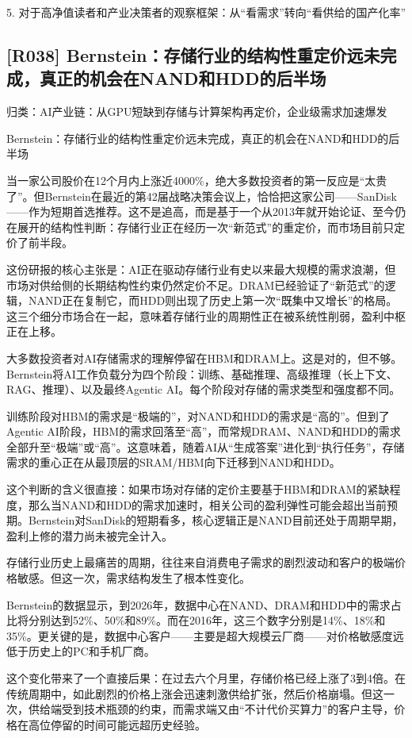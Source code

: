 \documentclass[11pt]{ctexart}
\begin{document}
5. 对于高净值读者和产业决策者的观察框架：从“看需求”转向“看供给的国产化率”

\subsection{[R038] Bernstein：存储行业的结构性重定价远未完成，真正的机会在NAND和HDD的后半场}
{\small\color{refgray}归类：AI产业链：从GPU短缺到存储与计算架构再定价，企业级需求加速爆发}

Bernstein：存储行业的结构性重定价远未完成，真正的机会在NAND和HDD的后半场

当一家公司股价在12个月内上涨近4000\%，绝大多数投资者的第一反应是“太贵了”。但Bernstein在最近的第42届战略决策会议上，恰恰把这家公司——SanDisk——作为短期首选推荐。这不是追高，而是基于一个从2013年就开始论证、至今仍在展开的结构性判断：存储行业正在经历一次“新范式”的重定价，而市场目前只定价了前半段。

这份研报的核心主张是：AI正在驱动存储行业有史以来最大规模的需求浪潮，但市场对供给侧的长期结构性约束仍然定价不足。DRAM已经验证了“新范式”的逻辑，NAND正在复制它，而HDD则出现了历史上第一次“既集中又增长”的格局。这三个细分市场合在一起，意味着存储行业的周期性正在被系统性削弱，盈利中枢正在上移。

大多数投资者对AI存储需求的理解停留在HBM和DRAM上。这是对的，但不够。Bernstein将AI工作负载分为四个阶段：训练、基础推理、高级推理（长上下文、RAG、推理）、以及最终Agentic AI。每个阶段对存储的需求类型和强度都不同。

训练阶段对HBM的需求是“极端的”，对NAND和HDD的需求是“高的”。但到了Agentic AI阶段，HBM的需求回落至“高”，而常规DRAM、NAND和HDD的需求全部升至“极端”或“高”。这意味着，随着AI从“生成答案”进化到“执行任务”，存储需求的重心正在从最顶层的SRAM/HBM向下迁移到NAND和HDD。

这个判断的含义很直接：如果市场对存储的定价主要基于HBM和DRAM的紧缺程度，那么当NAND和HDD的需求加速时，相关公司的盈利弹性可能会超出当前预期。Bernstein对SanDisk的短期看多，核心逻辑正是NAND目前还处于周期早期，盈利上修的潜力尚未被完全计入。

存储行业历史上最痛苦的周期，往往来自消费电子需求的剧烈波动和客户的极端价格敏感。但这一次，需求结构发生了根本性变化。

Bernstein的数据显示，到2026年，数据中心在NAND、DRAM和HDD中的需求占比将分别达到52\%、50\%和89\%。而在2016年，这三个数字分别是14\%、18\%和35\%。更关键的是，数据中心客户——主要是超大规模云厂商——对价格敏感度远低于历史上的PC和手机厂商。

这个变化带来了一个直接后果：在过去六个月里，存储价格已经上涨了3到4倍。在传统周期中，如此剧烈的价格上涨会迅速刺激供给扩张，然后价格崩塌。但这一次，供给端受到技术瓶颈的约束，而需求端又由“不计代价买算力”的客户主导，价格在高位停留的时间可能远超历史经验。
\end{document}
